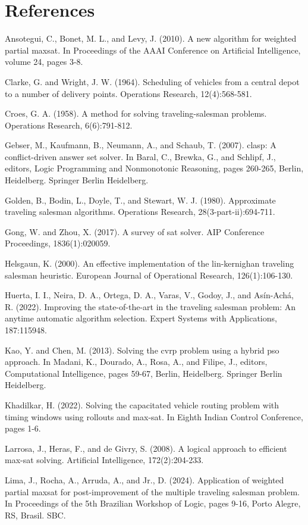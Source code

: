 \documentclass[10pt]{article}
\begin{document}
\section*{References}
Ansotegui, C., Bonet, M. L., and Levy, J. (2010). A new algorithm for weighted partial maxsat. In Proceedings of the AAAI Conference on Artificial Intelligence, volume 24, pages 3-8.

Clarke, G. and Wright, J. W. (1964). Scheduling of vehicles from a central depot to a number of delivery points. Operations Research, 12(4):568-581.

Croes, G. A. (1958). A method for solving traveling-salesman problems. Operations Research, 6(6):791-812.

Gebser, M., Kaufmann, B., Neumann, A., and Schaub, T. (2007). clasp: A conflict-driven answer set solver. In Baral, C., Brewka, G., and Schlipf, J., editors, Logic Programming and Nonmonotonic Reasoning, pages 260-265, Berlin, Heidelberg. Springer Berlin Heidelberg.

Golden, B., Bodin, L., Doyle, T., and Stewart, W. J. (1980). Approximate traveling salesman algorithms. Operations Research, 28(3-part-ii):694-711.

Gong, W. and Zhou, X. (2017). A survey of sat solver. AIP Conference Proceedings, 1836(1):020059.

Helsgaun, K. (2000). An effective implementation of the lin-kernighan traveling salesman heuristic. European Journal of Operational Research, 126(1):106-130.

Huerta, I. I., Neira, D. A., Ortega, D. A., Varas, V., Godoy, J., and Asín-Achá, R. (2022). Improving the state-of-the-art in the traveling salesman problem: An anytime automatic algorithm selection. Expert Systems with Applications, 187:115948.

Kao, Y. and Chen, M. (2013). Solving the cvrp problem using a hybrid pso approach. In Madani, K., Dourado, A., Rosa, A., and Filipe, J., editors, Computational Intelligence, pages 59-67, Berlin, Heidelberg. Springer Berlin Heidelberg.

Khadilkar, H. (2022). Solving the capacitated vehicle routing problem with timing windows using rollouts and max-sat. In Eighth Indian Control Conference, pages 1-6.

Larrosa, J., Heras, F., and de Givry, S. (2008). A logical approach to efficient max-sat solving. Artificial Intelligence, 172(2):204-233.

Lima, J., Rocha, A., Arruda, A., and Jr., D. (2024). Application of weighted partial maxsat for post-improvement of the multiple traveling salesman problem. In Proceedings of the 5th Brazilian Workshop of Logic, pages 9-16, Porto Alegre, RS, Brasil. SBC.
\end{document}
